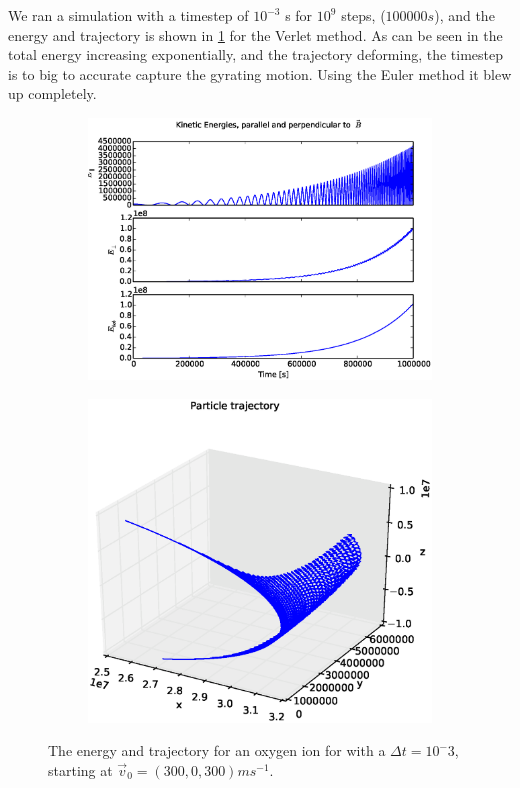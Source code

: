 \documentclass[x11names]{article}
\renewcommand{\va}{\vec}
\begin{document}
    We ran a simulation with a timestep of \(10^{-3}\) s for \(10^9\) steps, (\(100000 s\)), and the energy and trajectory is shown in \cref{fig:v_0_prop} for the Verlet method. As can be seen in the total energy increasing exponentially, and the trajectory deforming, the timestep is to big to accurate capture the gyrating motion. Using the Euler method it blew up completely.
    \begin{figure}[ht]
      \begin{subfigure}{0.45\textwidth}
        \includegraphics[width = \textwidth]{../source/figures/ion_9_3_Verletenergy}
      \end{subfigure}
      \begin{subfigure}{0.45\textwidth}
        \includegraphics[width = \textwidth]{../source/figures/ion_9_3_Verlet3Dplot}
      \end{subfigure}
      \caption{The energy and trajectory for an oxygen ion for with a \(\Delta t = 10^-3\), starting at \(\va{v}_0 = (300, 0, 300) \si{ms^{-1} }\).}
      \label{fig:v_0_prop}
    \end{figure}
\end{document}
